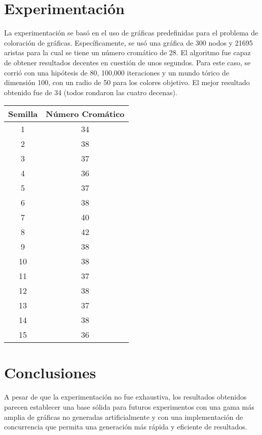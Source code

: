 \documentclass[a4paper]{report}
\begin{document}
\chapter{Experimentaci\'on}

La experimentaci\'on se bas\'o en el uso de gr\'aficas predefinidas para el problema
de coloraci\'on de gr\'aficas. Espec\'ificamente, se us\'o una gr\'afica de 300 nodos
y 21695 aristas para la cual se tiene un n\'umero crom\'atico de 28. El algoritmo fue
capaz de obtener resultados decentes en cuesti\'on de unos segundos. Para este caso,
se corri\'o con una hip\'otesis de 80, 100,000 iteraciones y un mundo t\'orico de
dimensi\'on 100, con un radio de 50 para los colores objetivo. El mejor resultado
obtenido fue de 34 (todos rondaron las cuatro decenas).

\begin{center}
  \begin{tabular}[h!]{|c|c|}
    \hline
    Semilla & N\'umero Crom\'atico\\
    \hline
    1 & 34\\
    \hline
    2 & 38\\
    \hline
    3 & 37\\
    \hline
    4 & 36\\
    \hline
    5 & 37\\
    \hline
    6 & 38\\
    \hline
    7 & 40\\
    \hline
    8 & 42\\
    \hline
    9 & 38\\
    \hline
    10 & 38\\
    \hline
    11 & 37\\
    \hline
    12 & 38\\
    \hline
    13 & 37\\
    \hline
    14 & 38\\
    \hline
    15 & 36\\
    \hline
  \end{tabular}
\end{center}
\chapter{Conclusiones}

A pesar de que la experimentaci\'on no fue exhaustiva, los resultados obtenidos parecen
establecer una base s\'olida para futuros experimentos con una gama m\'as amplia de
gr\'aficas no generadas artificialmente y con una implementaci\'on de concurrencia que
permita una generaci\'on m\'as r\'apida y eficiente de resultados.

{}

\end{document}
